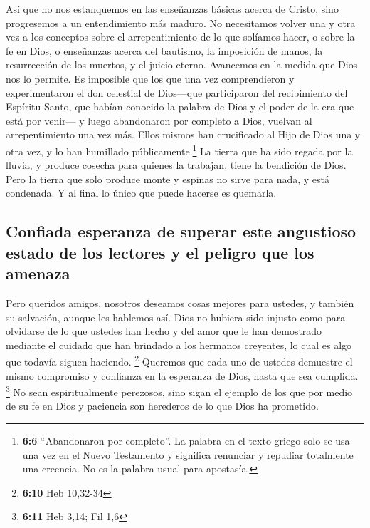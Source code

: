  Así que no nos estanquemos en las enseñanzas básicas
acerca de Cristo, sino progresemos a un entendimiento más maduro. No
necesitamos volver una y otra vez a los conceptos sobre el
arrepentimiento de lo que solíamos hacer, o sobre la fe en Dios,
 o enseñanzas acerca del bautismo, la imposición de manos,
la resurrección de los muertos, y el juicio eterno. 
Avancemos en la medida que Dios nos lo permite.  Es
imposible que los que una vez comprendieron y experimentaron el don
celestial de Dios---que participaron del recibimiento del Espíritu
Santo,  que habían conocido la palabra de Dios y el poder
de la era que está por venir---  y luego abandonaron por
completo a Dios, vuelvan al arrepentimiento una vez más. Ellos mismos
han crucificado al Hijo de Dios una y otra vez, y lo han humillado
públicamente.\footnote{\textbf{6:6} ``Abandonaron por completo''. La
  palabra en el texto griego solo se usa una vez en el Nuevo Testamento
  y significa renunciar y repudiar totalmente una creencia. No es la
  palabra usual para apostasía.}  La tierra que ha sido
regada por la lluvia, y produce cosecha para quienes la trabajan, tiene
la bendición de Dios.  Pero la tierra que solo produce
monte y espinas no sirve para nada, y está condenada. Y al final lo
único que puede hacerse es quemarla.

\hypertarget{confiada-esperanza-de-superar-este-angustioso-estado-de-los-lectores-y-el-peligro-que-los-amenaza}{%
\subsection{Confiada esperanza de superar este angustioso estado de los
lectores y el peligro que los
amenaza}\label{confiada-esperanza-de-superar-este-angustioso-estado-de-los-lectores-y-el-peligro-que-los-amenaza}}

 Pero queridos amigos, nosotros deseamos cosas mejores
para ustedes, y también su salvación, aunque les hablemos así.
 Dios no hubiera sido injusto como para olvidarse de lo
que ustedes han hecho y del amor que le han demostrado mediante el
cuidado que han brindado a los hermanos creyentes, lo cual es algo que
todavía siguen haciendo. \footnote{\textbf{6:10} Heb 10,32-34}
 Queremos que cada uno de ustedes demuestre el mismo
compromiso y confianza en la esperanza de Dios, hasta que sea cumplida.
\footnote{\textbf{6:11} Heb 3,14; Fil 1,6}  No sean
espiritualmente perezosos, sino sigan el ejemplo de los que por medio de
su fe en Dios y paciencia son herederos de lo que Dios ha prometido.


